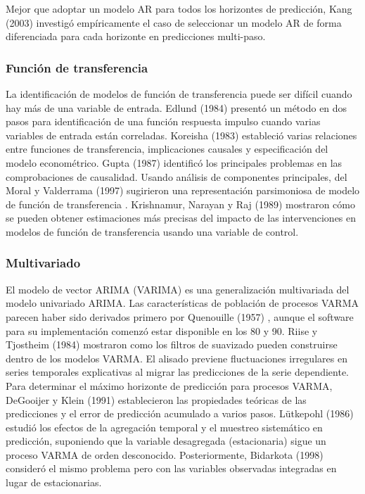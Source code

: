 \documentclass{llncs}
\begin{document}
Mejor que adoptar un modelo AR para todos los horizontes de predicción, Kang (2003) \cite{Kang2003387} investigó empíricamente el caso de seleccionar un modelo AR  de forma diferenciada para cada horizonte en predicciones multi-paso.

\subsubsection{Función de transferencia}
La identificación de modelos de función de transferencia puede ser difícil cuando hay más de una variable de entrada. Edlund (1984) \cite{Edlund1984297} presentó un método en dos pasos para identificación de una función respuesta impulso cuando varias variables de entrada están correladas. Koreisha (1983) \cite{Koreisha1983151} estableció varias relaciones entre funciones de transferencia, implicaciones causales y especificación del modelo econométrico. Gupta (1987) \cite{Gupta1987195} identificó los principales problemas en las comprobaciones de causalidad. Usando análisis de componentes principales, del Moral y Valderrama (1997) \cite{DelMoral1997237} sugirieron una representación parsimoniosa de  modelo de función de transferencia . Krishnamur, Narayan y Raj (1989) \cite{Krishnamurthi198921} mostraron cómo se pueden obtener estimaciones más precisas del impacto de las intervenciones en modelos de función de transferencia usando una variable de control.


\subsubsection{Multivariado}
El modelo de vector ARIMA (VARIMA) es una generalización multivariada del modelo univariado ARIMA. Las características de población de procesos VARMA parecen haber sido derivados primero por Quenouille (1957) \cite{Quenouille1957}, aunque el software para su implementación comenzó estar disponible en los 80 y 90. Riise y Tjostheim (1984) \cite{Riise1984309} mostraron como los filtros de suavizado pueden construirse dentro de los modelos VARMA. El alisado previene fluctuaciones irregulares en series temporales explicativas al migrar las predicciones de la serie dependiente. Para determinar el máximo horizonte de predicción para procesos VARMA, DeGooijer y Klein (1991) \cite{DeGooijer1992135} establecieron las propiedades teóricas de las predicciones y el error de predicción acumulado a varios pasos. Lütkepohl (1986) \cite{Lutkepohl1986461} estudió los efectos de la agregación temporal y el muestreo sistemático en predicción, suponiendo que la variable desagregada (estacionaria) sigue un proceso VARMA de orden desconocido. Posteriormente, Bidarkota (1998) \cite{Bidarkota1998457} consideró el mismo problema pero con las variables observadas integradas en lugar de estacionarias.
\end{document}
